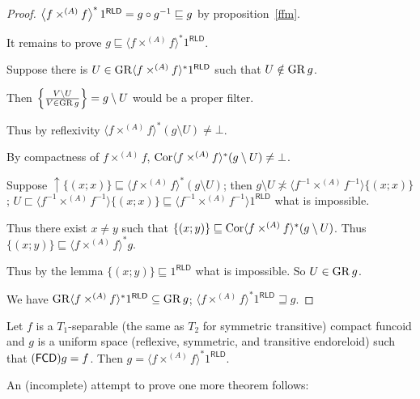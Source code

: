 \begin{proof}
$\left\langle  f \times^{(A)} f \right\rangle ^{\ast} 1^{\mathsf{RLD}} = g \circ g^{- 1} \sqsubseteq g$ by proposition~\ref{ffm}.

It remains to prove $g \sqsubseteq \langle f \times^{(A)} f \rangle^{\ast}
1^{\mathsf{RLD}}$. 


Suppose there is $U \in \operatorname{GR} \langle f \times^{(A)} f \rangle^{\ast} 1^{\mathsf{RLD}}$
such that $U \notin \operatorname{GR} g$.

Then $\left\{ \frac{ V \setminus U }{ V \in \operatorname{GR} g }\right\} = g \setminus U$ would be a proper filter.

Thus by reflexivity $\langle f \times^{(A)} f \rangle^{\ast} (g \setminus U) \neq
\bot$.

By compactness of $f \times^{(A)} f$, $\operatorname{Cor} \langle f \times^{(A)} f \rangle^{\ast}
(g \setminus U) \neq \bot$.

Suppose $\uparrow \{ (x ; x) \} \sqsubseteq \langle f \times^{(A)} f \rangle^{\ast}
(g \setminus U)$; then $g \setminus U \nasymp \langle f^{- 1} \times^{(A)} f^{- 1}
\rangle \{ (x ; x) \}$; $U \sqsubset \langle f^{- 1} \times^{(A)} f^{- 1} \rangle \{
(x ; x) \} \sqsubseteq \langle f^{- 1} \times^{(A)} f^{- 1} \rangle 1^{\mathsf{RLD}}$ what is
impossible.

Thus there exist $x \neq y$ such that $\{ (x ; y) \} \sqsubseteq \operatorname{Cor}
\langle f \times^{(A)} f \rangle^{\ast} (g \setminus U)$. Thus $\{ (x ; y) \}
\sqsubseteq \langle f \times^{(A)} f \rangle^{\ast} g$.

Thus by the lemma $\{ (x ; y) \} \sqsubseteq 1^{\mathsf{RLD}}$ what is impossible. So $U
\in \operatorname{GR} g$.

We have $\operatorname{GR} \langle f \times^{(A)} f \rangle^{\ast} 1^{\mathsf{RLD}} \subseteq
\operatorname{GR} g$; $\langle f \times^{(A)} f \rangle^{\ast} 1^{\mathsf{RLD}} \sqsupseteq g$.
\end{proof}

\begin{cor}
  Let $f$ is a $T_1$-separable (the same as $T_2$ for symmetric transitive)
  compact funcoid and $g$ is a uniform space (reflexive, symmetric, and
  transitive endoreloid) such that $(\mathsf{FCD}) g = f$. Then $g =
  \langle f \times^{(A)} f \rangle^{\ast} 1^{\mathsf{RLD}}$.
\end{cor}

An (incomplete) attempt to prove one more theorem follows:

